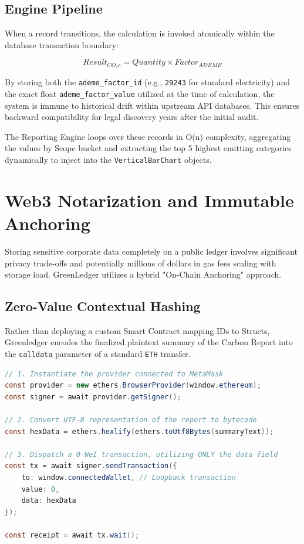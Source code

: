 \documentclass[12pt,a4paper]{article}
\begin{document}
\subsection{Engine Pipeline}
When a record transitions, the calculation is invoked atomically within the database transaction boundary:

\begin{equation}
    Result_{CO_2e} = Quantity \times Factor_{ADEME}
\end{equation}

By storing both the \texttt{ademe\_factor\_id} (e.g., \texttt{29243} for standard electricity) and the exact float \texttt{ademe\_factor\_value} utilized at the time of calculation, the system is immune to historical drift within upstream API databases. This ensures backward compatibility for legal discovery years after the initial audit.

The Reporting Engine loops over these records in O(n) complexity, aggregating the values by Scope bucket and extracting the top 5 highest emitting categories dynamically to inject into the \texttt{VerticalBarChart} objects.

\section{Web3 Notarization and Immutable Anchoring}

Storing sensitive corporate data completely on a public ledger involves significant privacy trade-offs and potentially millions of dollars in gas fees scaling with storage load. GreenLedger utilizes a hybrid "On-Chain Anchoring" approach.

\subsection{Zero-Value Contextual Hashing}
Rather than deploying a custom Smart Contract mapping IDs to Structs, Greenledger encodes the finalized plaintext summary of the Carbon Report into the \texttt{calldata} parameter of a standard \texttt{ETH} transfer.

\begin{lstlisting}[language=Java, caption=Client-Side Web3 Injection via Ethers.js]
// 1. Instantiate the provider connected to MetaMask
const provider = new ethers.BrowserProvider(window.ethereum);
const signer = await provider.getSigner();

// 2. Convert UTF-8 representation of the report to bytecode
const hexData = ethers.hexlify(ethers.toUtf8Bytes(summaryText));

// 3. Dispatch a 0-WeI transaction, utilizing ONLY the data field
const tx = await signer.sendTransaction({
    to: window.connectedWallet, // Loopback transaction
    value: 0,
    data: hexData
});

const receipt = await tx.wait();
\end{lstlisting}
\end{document}
